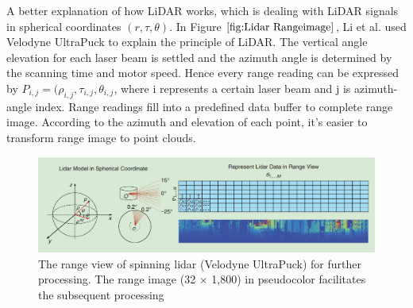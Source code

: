 A better explanation of how LiDAR works, which is dealing with LiDAR signals in spherical coordinates \((r,\tau,\theta)\). In Figure \(\ref{fig:Lidar Rangeimage}\), Li et al.\cite{li_lidar_2020} used Velodyne UltraPuck to explain the principle of LiDAR. The vertical angle elevation for each laser beam is settled and the azimuth angle is determined by the scanning time and motor speed. Hence every range reading can be expressed by \(P_{i,j}=(\rho_{i,j},\tau_{i,j},\theta_{i,j}\), where i represents a certain laser beam and j is azimuth-angle index. Range readings fill into a predefined data buffer to complete range image. According to the azimuth and elevation of each point, it's easier to transform range image to point clouds.
  \begin{figure}[!htbp]
\centering
\includegraphics[scale=0.45]{Graphics/LIDAR RangeImage.png}
\caption{The range view of spinning lidar (Velodyne UltraPuck) for further processing. The range image (32 × 1,800) in pseudocolor facilitates the subsequent processing\cite{li_lidar_2020}}
\label{fig:Lidar Rangeimage}
\end{figure}
 
